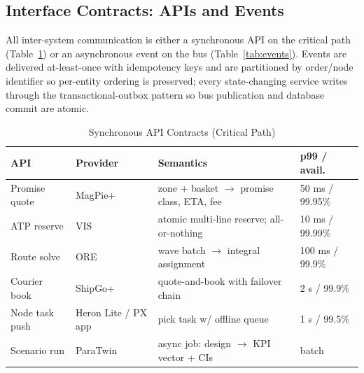 \documentclass[journal]{IEEEtran}
\begin{document}
\subsection{Interface Contracts: APIs and Events}
All inter-system communication is either a synchronous API on the critical path (Table~\ref{tab:apis}) or an asynchronous event on the bus (Table~\ref{tab:events}). Events are delivered at-least-once with idempotency keys and are partitioned by order/node identifier so per-entity ordering is preserved; every state-changing service writes through the transactional-outbox pattern so bus publication and database commit are atomic.

\begin{table}[!t]
\caption{Synchronous API Contracts (Critical Path)}
\label{tab:apis}
\centering
\scriptsize
\begin{tabularx}{\columnwidth}{@{}l l X l@{}}
\toprule
\textbf{API} & \textbf{Provider} & \textbf{Semantics} & \textbf{p99 / avail.} \\
\midrule
Promise quote & MagPie+ & zone + basket $\to$ promise class, ETA, fee & 50 ms / 99.95\% \\
ATP reserve & VIS & atomic multi-line reserve; all-or-nothing & 10 ms / 99.99\% \\
Route solve & ORE & wave batch $\to$ integral assignment & 100 ms / 99.9\% \\
Courier book & ShipGo+ & quote-and-book with failover chain & 2 s / 99.9\% \\
Node task push & Heron Lite / PX app & pick task w/ offline queue & 1 s / 99.5\% \\
Scenario run & ParaTwin & async job: design $\to$ KPI vector + CIs & batch \\
\bottomrule
\end{tabularx}
\end{table}
\end{document}
